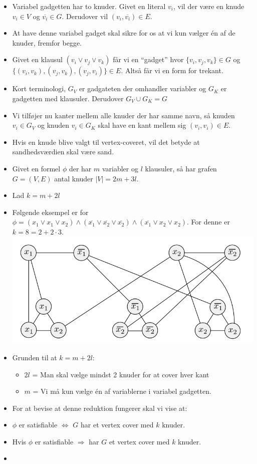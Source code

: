 \begin{frame}[allowframebreaks]
\begin{itemize}
		\item Variabel gadgetten har to knuder. Givet en literal $v_{i}$, vil der være en knude $v_{i} \in V$  og $\overline{v_{i}} \in G$. Derudover vil $(v_{i}, \overline{v_{i}}) \in E$.
		\item At have denne variabel gadget skal sikre for os at vi kun vælger én af de knuder, fremfor begge.
		\item Givet en klausul $(v_{i} \lor v_{j} \lor v_{k})$ får vi en ``gadget'' hvor $\{v_{i}, v_{j}, v_{k}\} \in G$ og $\{(v_{i}, v_{k}), (v_{j}, v_{k}), (v_{j}, v_{i})\} \in E$. Altså får vi en form for trekant.
		\item Kort terminologi, $G_{V}$ er gadgateten der omhandler variabler og $G_{K}$ er gadgetten med klausuler. Derudover $G_{V} \cup G_{K} = G$
		\item Vi tilføjer nu kanter mellem alle knuder der har samme navn, så knuden $v_{i} \in G_{V}$ og knuden $v_{i} \in G_{K}$ skal have en kant mellem sig $(v_{i}, v_{i}) \in E$.
		\item Hvis en knude blive valgt til vertex-coveret, vil det betyde at sandhedsværdien skal være sand.
		\item Givet en formel $\phi$ der har $m$ variabler og $l$ klausuler, så har grafen $G = (V,E)$ antal knuder $|V| = 2m+3l$.
		\item Lad $k = m+2l$
		\item Følgende eksempel er for $\phi = (x_{1} \lor x_{1} \lor x_{2}) \land (\overline{x_{1}} \lor \overline{x_{2}} \lor \overline{x_{2}}) \land (\overline{x_{1}} \lor x_{2} \lor x_{2})$. For denne er $k = 8 = 2 + 2 \cdot 3$.
		      \includegraphics[scale=0.5]{figur/figur745.png}
		\item Grunden til at $k = m+2l$:
		      \begin{itemize}
			      \item $2l$ = Man skal vælge mindst 2 knuder for at cover hver kant
			      \item $m$ = Vi må kun vælge én af variablerne i variabel gadgetten.
		      \end{itemize}
		\item For at bevise at denne reduktion fungerer skal vi vise at:
		\item $\phi$ er satisfiable $\iff$ $G$ har et vertex cover med $k$ knuder.
		\item Hvis \(\phi\) er satisfiable \(\Rightarrow\) har $G$ et vertex cover med $k$ knuder.
		\item
	\end{itemize}
\end{frame}

